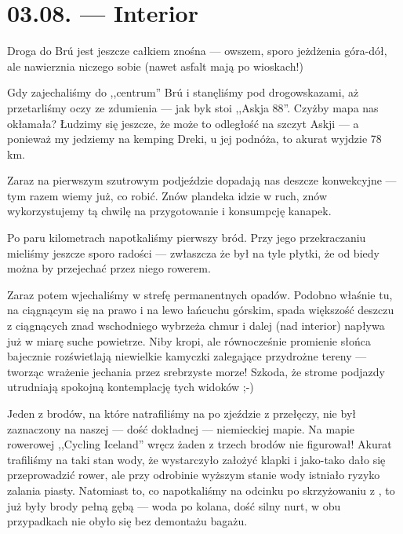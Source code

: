 \chapter*{03.08. --- Interior}

Droga do Brú jest jeszcze całkiem znośna --- owszem, sporo jeżdżenia góra-dół, ale nawierznia niczego sobie (nawet asfalt mają po wioskach!)

Gdy zajechaliśmy do ,,centrum'' Brú i stanęliśmy pod drogowskazami, aż przetarliśmy oczy ze zdumienia --- jak byk stoi ,,Askja 88''. Czyżby mapa nas okłamała? Łudzimy się jeszcze, że może to odległość na szczyt Askji --- a ponieważ my jedziemy na kemping Dreki, u jej podnóża, to akurat wyjdzie 78 km.

Zaraz na pierwszym szutrowym podjeździe dopadają nas deszcze konwekcyjne --- tym razem wiemy już, co robić. Znów plandeka idzie w ruch, znów wykorzystujemy tą chwilę na przygotowanie i konsumpcję kanapek.

Po paru kilometrach napotkaliśmy pierwszy bród. Przy jego przekraczaniu mieliśmy jeszcze sporo radości --- zwłaszcza że był na tyle płytki, że od biedy można by przejechać przez niego rowerem.

Zaraz potem wjechaliśmy w strefę permanentnych opadów. Podobno właśnie tu, na ciągnącym się na prawo i na lewo łańcuchu górskim, spada większość deszczu z ciągnących znad wschodniego wybrzeża chmur i dalej (nad interior) napływa już w miarę suche powietrze. Niby kropi, ale równocześnie promienie słońca bajecznie rozświetlają niewielkie kamyczki zalegające przydrożne tereny --- tworząc wrażenie jechania przez srebrzyste morze! Szkoda, że strome podjazdy utrudniają spokojną kontemplację tych widoków ;-)


Jeden z brodów, na które natrafiliśmy na  po zjeździe z przełęczy, nie był zaznaczony na naszej --- dość dokładnej --- niemieckiej mapie. Na mapie rowerowej ,,Cycling Iceland'' wręcz żaden z trzech brodów nie figurował! Akurat trafiliśmy na taki stan wody, że wystarczyło założyć klapki i jako-tako dało się przeprowadzić rower, ale przy odrobinie wyższym stanie wody istniało ryzyko zalania piasty. Natomiast to, co napotkaliśmy na odcinku po skrzyżowaniu z , to już były brody pełną gębą --- woda po kolana, dość silny nurt, w obu przypadkach nie obyło się bez demontażu bagażu.


